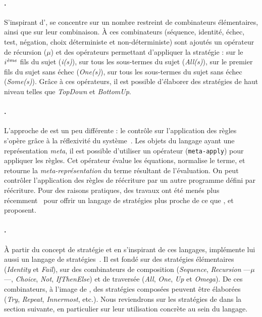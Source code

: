 \paragraph{{\stratego}.} S'inspirant d'{\elan}, {\stratego} se concentre sur un
nombre restreint de combinateurs élémentaires, ainsi que sur leur combinaison.
À ces combinateurs (séquence, identité, échec, test, négation, choix
déterministe et non-déterministe) sont ajoutés un opérateur de récursion
($\mu$) et des opérateurs permettant d'appliquer la stratégie : sur le
$i^{\text{\textit{ème}}}$ fils du sujet (\emph{i(s)}), sur tous les sous-termes
du sujet (\emph{All(s)}), sur le premier fils du sujet sans échec
(\emph{One(s)}), sur tous les sous-termes du sujet sans échec (\emph{Some(s)}).
Grâce à ces opérateurs, il est possible d'élaborer des stratégies de haut
niveau telles que \emph{TopDown} et \emph{BottomUp}.

\paragraph{{\maude}.} L'approche de {\maude} est un peu différente : le
contrôle sur l'application des règles s'opère grâce à la réflexivité du
système~\cite{Clavel1996,Clavel2002a}. Les objets du langage {\maude} ayant une
représentation \emph{meta}, il est possible d'utiliser un opérateur
(\texttt{meta-apply}) pour appliquer les règles. Cet opérateur évalue les
équations, normalise le terme, et retourne la \emph{meta-représentation} du
terme résultant de l'évaluation. On peut contrôler l'application des règles de
réécriture par un autre programme défini par réécriture. Pour des raisons
pratiques, des travaux ont été menés plus
récemment~\cite{MartiOliet2005,Eker2007} pour offrir un langage de stratégies
plus proche de ce que {\elan}, {\stratego} et {\tom} proposent.


\paragraph{{\tom}.} À partir du concept de stratégie et en s'inspirant de ces
langages, {\tom} implémente lui aussi un langage de
stratégies~\cite{BallandMR08,Balland2012}. Il est fondé sur des stratégies
élémentaires (\emph{Identity} et \emph{Fail}), sur des combinateurs de
composition (\emph{Sequence}, \emph{Recursion} ---$\mu$---, \emph{Choice},
\emph{Not}, \emph{IfThenElse}) et de traversée (\emph{All}, \emph{One},
\emph{Up} et \emph{Omega}). De ces combinateurs, à l'image de {\stratego}, des
stratégies composées peuvent être élaborées (\emph{Try}, \emph{Repeat},
\emph{Innermost}, etc.). Nous reviendrons sur les stratégies de {\tom} dans la
section suivante, en particulier sur leur utilisation concrète au sein du
langage.



